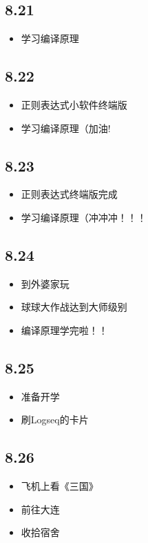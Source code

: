 \documentclass[UTF8]{ctexart}
\begin{document}
\subsection*{8.21}
\begin{itemize}
    \item 学习编译原理
\end{itemize}
\subsection*{8.22}
\begin{itemize}
    \item 正则表达式小软件终端版
    \item 学习编译原理（加油!
\end{itemize}
\subsection*{8.23}
\begin{itemize}
    \item 正则表达式终端版完成
    \item 学习编译原理（冲冲冲！！！
\end{itemize}
\subsection*{8.24}
\begin{itemize}
    \item 到外婆家玩
    \item 球球大作战达到大师级别
    \item 编译原理学完啦！！
\end{itemize}
\subsection*{8.25}
\begin{itemize}
    \item 准备开学
    \item 刷Logseq的卡片
\end{itemize}
\subsection*{8.26}
\begin{itemize}
    \item 飞机上看《三国》
    \item 前往大连
    \item 收拾宿舍
\end{itemize}
\end{document}
